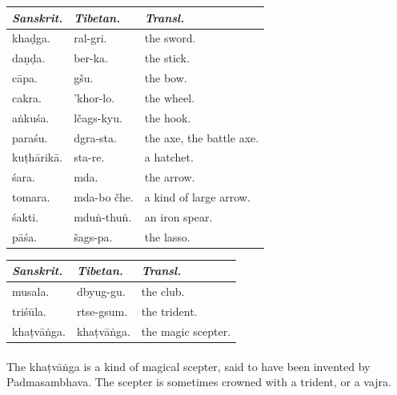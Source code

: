 \documentclass[a4paper, 12pt, oneside]{article}
\begin{document}
\begin{table}[H]
    \centering
    \small
    \bfseries
    \begin{tabular}{l l l}
           \emph{Sanskrit.}  &  \emph{Tibetan.}  &  \emph{Transl.}           \\ \hline
        kha\d{d}ga.     &  ral-gri.     &  the sword.                \\
         da\d{n}\d{d}a.      &  ber-ka.      &  the stick.                \\
         c\={a}pa.       &  gšu.         &  the bow.                  \\
         cakra.      &  'khor-lo.    &  the wheel.                \\
         a\.{n}ku\'{s}a.     &  lčags-kyu.   &  the hook.                 \\
         para\'{s}u.     &  dgra-sta.    &  the axe, the battle axe.  \\
         ku\d{t}h\={a}rik\={a}.  &  sta-re.      &  a hatchet.                \\
         \'{s}ara.       &  mda.         &  the arrow.                \\
         tomara.     &  mda-bo čhe.  &  a kind of large arrow.    \\
         \'{s}akti.      &  mdu\.{n}-thu\.{n}.   &  an iron spear.            \\
         p\={a}\'{s}a.       &  šags-pa.     &  the lasso. \\
    \end{tabular}
\end{table}

\begin{table}[H]
    \centering
    \small
    \bfseries
    \begin{tabular}{l l l}
   
        \emph{Sanskrit.}  &  \emph{Tibetan.}  &  \emph{Transl.}           \\ \hline
         musala.      &  dbyug-gu.   &  the club.           \\
         tri\'{s}\={u}la.     &  rtse-gsum.  &  the trident.        \\
         kha\d{t}v\={a}\.{n}ga.   &  kha\d{t}v\={a}\.{n}ga.  &  the magic scepter. \\
    \end{tabular}
\end{table}
\paragraph{}
The kha\d{t}v\={a}\.{n}ga is a kind of magical scepter, said to have been invented by Padmasambhava. The scepter is sometimes crowned with a trident, or a vajra.
\end{document}
